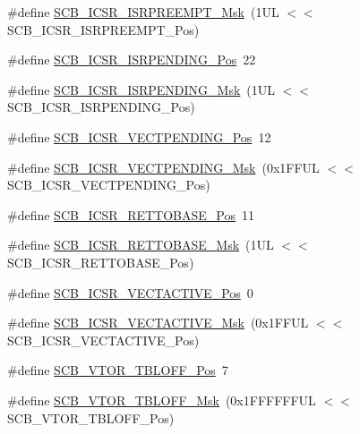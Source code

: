 \begin{DoxyCompactItemize}
\item 
\#define \hyperlink{group___c_m_s_i_s___s_c_b_gaa966600396290808d596fe96e92ca2b5}{S\-C\-B\-\_\-\-I\-C\-S\-R\-\_\-\-I\-S\-R\-P\-R\-E\-E\-M\-P\-T\-\_\-\-Msk}~(1\-U\-L $<$$<$ S\-C\-B\-\_\-\-I\-C\-S\-R\-\_\-\-I\-S\-R\-P\-R\-E\-E\-M\-P\-T\-\_\-\-Pos)
\item 
\#define \hyperlink{group___c_m_s_i_s___s_c_b_ga10749d92b9b744094b845c2eb46d4319}{S\-C\-B\-\_\-\-I\-C\-S\-R\-\_\-\-I\-S\-R\-P\-E\-N\-D\-I\-N\-G\-\_\-\-Pos}~22
\item 
\#define \hyperlink{group___c_m_s_i_s___s_c_b_ga056d74fd538e5d36d3be1f28d399c877}{S\-C\-B\-\_\-\-I\-C\-S\-R\-\_\-\-I\-S\-R\-P\-E\-N\-D\-I\-N\-G\-\_\-\-Msk}~(1\-U\-L $<$$<$ S\-C\-B\-\_\-\-I\-C\-S\-R\-\_\-\-I\-S\-R\-P\-E\-N\-D\-I\-N\-G\-\_\-\-Pos)
\item 
\#define \hyperlink{group___c_m_s_i_s___s_c_b_gada60c92bf88d6fd21a8f49efa4a127b8}{S\-C\-B\-\_\-\-I\-C\-S\-R\-\_\-\-V\-E\-C\-T\-P\-E\-N\-D\-I\-N\-G\-\_\-\-Pos}~12
\item 
\#define \hyperlink{group___c_m_s_i_s___s_c_b_gacb6992e7c7ddc27a370f62878a21ef72}{S\-C\-B\-\_\-\-I\-C\-S\-R\-\_\-\-V\-E\-C\-T\-P\-E\-N\-D\-I\-N\-G\-\_\-\-Msk}~(0x1\-F\-F\-U\-L $<$$<$ S\-C\-B\-\_\-\-I\-C\-S\-R\-\_\-\-V\-E\-C\-T\-P\-E\-N\-D\-I\-N\-G\-\_\-\-Pos)
\item 
\#define \hyperlink{group___c_m_s_i_s___s_c_b_ga403d154200242629e6d2764bfc12a7ec}{S\-C\-B\-\_\-\-I\-C\-S\-R\-\_\-\-R\-E\-T\-T\-O\-B\-A\-S\-E\-\_\-\-Pos}~11
\item 
\#define \hyperlink{group___c_m_s_i_s___s_c_b_gaca6fc3f79bb550f64fd7df782ed4a5f6}{S\-C\-B\-\_\-\-I\-C\-S\-R\-\_\-\-R\-E\-T\-T\-O\-B\-A\-S\-E\-\_\-\-Msk}~(1\-U\-L $<$$<$ S\-C\-B\-\_\-\-I\-C\-S\-R\-\_\-\-R\-E\-T\-T\-O\-B\-A\-S\-E\-\_\-\-Pos)
\item 
\#define \hyperlink{group___c_m_s_i_s___s_c_b_gae4f602c7c5c895d5fb687b71b0979fc3}{S\-C\-B\-\_\-\-I\-C\-S\-R\-\_\-\-V\-E\-C\-T\-A\-C\-T\-I\-V\-E\-\_\-\-Pos}~0
\item 
\#define \hyperlink{group___c_m_s_i_s___s_c_b_ga5533791a4ecf1b9301c883047b3e8396}{S\-C\-B\-\_\-\-I\-C\-S\-R\-\_\-\-V\-E\-C\-T\-A\-C\-T\-I\-V\-E\-\_\-\-Msk}~(0x1\-F\-F\-U\-L $<$$<$ S\-C\-B\-\_\-\-I\-C\-S\-R\-\_\-\-V\-E\-C\-T\-A\-C\-T\-I\-V\-E\-\_\-\-Pos)
\item 
\#define \hyperlink{group___c_m_s_i_s___s_c_b_gac6a55451ddd38bffcff5a211d29cea78}{S\-C\-B\-\_\-\-V\-T\-O\-R\-\_\-\-T\-B\-L\-O\-F\-F\-\_\-\-Pos}~7
\item 
\#define \hyperlink{group___c_m_s_i_s___s_c_b_ga75e395ed74042923e8c93edf50f0996c}{S\-C\-B\-\_\-\-V\-T\-O\-R\-\_\-\-T\-B\-L\-O\-F\-F\-\_\-\-Msk}~(0x1\-F\-F\-F\-F\-F\-F\-U\-L $<$$<$ S\-C\-B\-\_\-\-V\-T\-O\-R\-\_\-\-T\-B\-L\-O\-F\-F\-\_\-\-Pos)

\end{DoxyCompactItemize}
